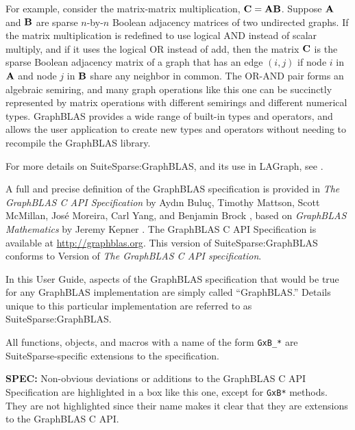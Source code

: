 \documentclass[12pt]{article}
\begin{document}
For example, consider the matrix-matrix multiplication, ${\bf C=AB}$.  Suppose
${\bf A}$ and ${\bf B}$ are sparse $n$-by-$n$ Boolean adjacency matrices of two
undirected graphs.  If the matrix multiplication is redefined to use logical
AND instead of scalar multiply, and if it uses the logical OR instead of add,
then the matrix ${\bf C}$ is the sparse Boolean adjacency matrix of a graph
that has an edge $(i,j)$ if node $i$ in ${\bf A}$ and node $j$ in ${\bf B}$
share any neighbor in common.  The OR-AND pair forms an algebraic semiring, and
many graph operations like this one can be succinctly represented by matrix
operations with different semirings and different numerical types.  GraphBLAS
provides a wide range of built-in types and operators, and allows the user
application to create new types and operators without needing to recompile the
GraphBLAS library.

For more details on SuiteSparse:GraphBLAS, and its use in LAGraph, see
\cite{Davis19,Davis21,Davis18b,DavisAznavehKolodziej19,Davis20,Mattson19}.

A full and precise definition of the GraphBLAS specification is provided in
{\em The GraphBLAS C API Specification} by {Ayd\i n Bulu\c{c}, Timothy Mattson,
Scott McMillan, Jos\'e Moreira, Carl Yang, and Benjamin Brock}
\cite{BulucMattsonMcMillanMoreiraYang17,spec,spec2}, based on {\em GraphBLAS
Mathematics} by Jeremy Kepner \cite{Kepner2017}.  The GraphBLAS C API
Specification is available at \url{http://graphblas.org}.
This version of SuiteSparse:GraphBLAS conforms to Version
 of {\em The GraphBLAS C API specification}.

In this User Guide, aspects of the GraphBLAS specification that would be true
for any GraphBLAS implementation are simply called ``GraphBLAS.'' Details
unique to this particular implementation are referred to as
SuiteSparse:GraphBLAS.

All functions, objects, and macros with a name of the form \verb'GxB_*' are
SuiteSparse-specific extensions to the specification.

\begin{alert}
{\bf SPEC:} Non-obvious deviations or additions to the GraphBLAS C API
Specification are highlighted in a box like this one, except for \verb'GxB*'
methods.  They are not highlighted since their name makes it clear that they
are extensions to the GraphBLAS C API.
\end{alert}

\newpage
\end{document}
